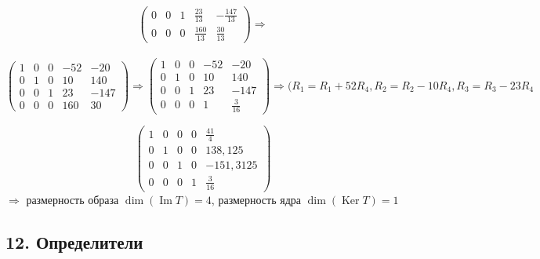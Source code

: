 \documentclass[]{book}
\theoremstyle{definition}
\DeclareMathOperator{\Ima}{Im}
\DeclareMathOperator{\Ker}{Ker}
\begin{document}
\begin{enumerate}[resume]
$$\begin{pmatrix}
0 & 0 & 1 & \frac{23}{13} & -\frac{147}{13}\\
0 & 0 & 0 & \frac{160}{13} & \frac{30}{13} 
\end{pmatrix} 
\Longrightarrow$$
\\
$$
\begin{pmatrix} 
1 & 0 & 0 & -52 & -20 \\
0 & 1 & 0 & 10 & 140\\
0 & 0 & 1 & 23 & -147\\
0 & 0 & 0 & 160 & 30 
\end{pmatrix} 
\Longrightarrow 
\begin{pmatrix} 
1 & 0 & 0 & -52 & -20\\
0 & 1 & 0 & 10 & 140\\
0 & 0 & 1 & 23 & -147\\
0 & 0 & 0 & 1 & \frac{3}{16} 
\end{pmatrix} 
\Longrightarrow (R_1=R_1+52R_4,R_2=R_2-10R_4,R_3=R_3-23R_4$$
\end{enumerate}

$$\begin{pmatrix} 
1 & 0 & 0 & 0 & \frac{41}{4}\\
0 & 1 & 0 & 0 & 138, 125\\
0 & 0 & 1 & 0 & -151,3125\\
0 & 0 & 0 & 1 & \frac{3}{16} 
\end{pmatrix} $$
$\Longrightarrow$ размерность образа $\dim(\Ima T) = 4$, размерность ядра $\dim(\Ker T) = 1$

\subsection*{12. Определители}
\end{document}
